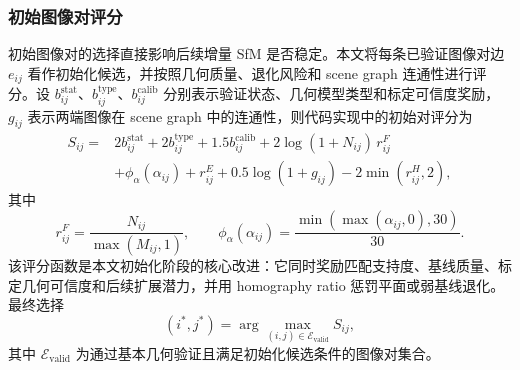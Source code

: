\documentclass[lang=cn,a4paper,newtx]{elegantpaper} %
\begin{document}
\subsubsection{初始图像对评分}
初始图像对的选择直接影响后续增量 SfM 是否稳定。本文将每条已验证图像对边 $e_{ij}$ 看作初始化候选，并按照几何质量、退化风险和 scene graph 连通性进行评分。设 $b_{ij}^{\mathrm{stat}}$、$b_{ij}^{\mathrm{type}}$、$b_{ij}^{\mathrm{calib}}$ 分别表示验证状态、几何模型类型和标定可信度奖励，$g_{ij}$ 表示两端图像在 scene graph 中的连通性，则代码实现中的初始对评分为
\begin{equation}
\begin{aligned}
    S_{ij}={}&
    2b_{ij}^{\mathrm{stat}}
    +2b_{ij}^{\mathrm{type}}
    +1.5b_{ij}^{\mathrm{calib}}
    +2\log(1+N_{ij})\,r_{ij}^{F}  \\
    &+\phi_{\alpha}(\alpha_{ij})
    +r_{ij}^{E}
    +0.5\log(1+g_{ij})
    -2\min(r_{ij}^{H},2),
\end{aligned}
\end{equation}
其中
\begin{equation}
    r_{ij}^{F}=\frac{N_{ij}}{\max(M_{ij},1)},
    \qquad
    \phi_{\alpha}(\alpha_{ij})
    =
    \frac{\min(\max(\alpha_{ij},0),30)}{30}.
\end{equation}
该评分函数是本文初始化阶段的核心改进：它同时奖励匹配支持度、基线质量、标定几何可信度和后续扩展潜力，并用 homography ratio 惩罚平面或弱基线退化。最终选择
\begin{equation}
    (i^{*},j^{*})
    =
    \arg\max_{(i,j)\in\mathcal{E}_{\mathrm{valid}}}S_{ij},
\end{equation}
其中 $\mathcal{E}_{\mathrm{valid}}$ 为通过基本几何验证且满足初始化候选条件的图像对集合。
\end{document}
